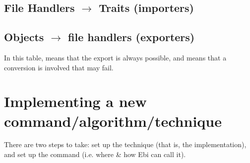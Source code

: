 \documentclass{book}
\begin{document}
        \clearpage
        \subsection{File Handlers $\rightarrow$ Traits (importers)}
            \begin{center}
                \filehandlerstraits
            \end{center}
        
        \clearpage
        \subsection{Objects $\rightarrow$ file handlers (exporters)}
            \begin{center}
                \objecttypesfilehandlers
            \end{center}
            In this table, \CIRCLE{} means that the export is always possible, and \LEFTcircle{} means that a conversion is involved that may fail.
        \restoregeometry
            
	\section{Implementing a new command/algorithm/technique}
	\label{sec:implement}
		There are two steps to take: set up the technique (that is, the implementation), and set up the command (i.e. where \& how Ebi can call it).
		
\end{document}
